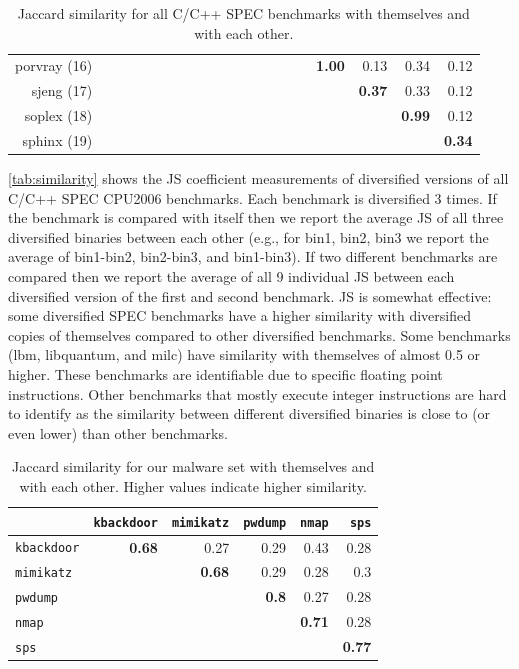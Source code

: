 \documentclass[letterpaper,twocolumn,10pt]{article}
\begin{document}
\begin{table}[ht!]
\begin{center}
\begin{tabular}{r|rrrrrrrrrrrrrrrrrrr}
porvray (16)&&&&&&&&&&&&&&&&\textbf{1.00} & 0.13 & 0.34 & 0.12\\
sjeng (17)&&&&&&&&&&&&&&&&&\textbf{0.37} & 0.33 & 0.12\\
soplex (18)&&&&&&&&&&&&&&&&&&\textbf{0.99} & 0.12\\
sphinx (19)&&&&&&&&&&&&&&&&&&&\textbf{0.34}\\
\end{tabular}
\caption{Jaccard similarity for all C/C++ SPEC benchmarks with themselves and
  with each other. %
}
\label{tab:similarity}
\end{center}
\end{table}

\autoref{tab:similarity} shows the JS coefficient measurements of diversified
versions of all C/C++ SPEC CPU2006 benchmarks. Each benchmark is diversified 3
times. If the benchmark is compared with itself then we report the average JS of
all three diversified binaries between each other (e.g., for bin1, bin2, bin3 we
report the average of bin1-bin2, bin2-bin3, and bin1-bin3). If two different
benchmarks are compared then we report the average of all 9 individual JS
between each diversified version of the first and second benchmark.
JS is somewhat effective: some diversified SPEC benchmarks have a higher
similarity with diversified copies of themselves compared to other diversified
benchmarks. Some benchmarks (lbm, libquantum, and milc) have similarity with
themselves of almost 0.5 or higher. These benchmarks are identifiable due to
specific floating point instructions. Other benchmarks that mostly execute
integer instructions are hard to identify as the similarity between different
diversified binaries is close to (or even lower) than other benchmarks.

\begin{table}[t!]
  \small
  \setlength{\tabcolsep}{2.2pt}
\begin{center}
\begin{tabular}{lrrrrr}
&  {\tt kbackdoor} & {\tt mimikatz} & {\tt pwdump} & {\tt nmap} & {\tt sps} \\
\hline
{\tt kbackdoor} &\textbf{0.68} & 0.27 & 0.29 & 0.43 & 0.28\\
{\tt mimikatz} &&\textbf{0.68} & 0.29 & 0.28 & 0.3\\
{\tt pwdump}  &&&\textbf{0.8} & 0.27 & 0.28\\
{\tt nmap} &&&&\textbf{0.71} & 0.28\\
{\tt sps} &&&&&\textbf{0.77}\\
\end{tabular}
\caption{Jaccard similarity for our malware set with themselves and with each
  other. Higher values indicate higher similarity.}
\label{tab:similarity2}
\end{center}
\end{table}
\end{document}
